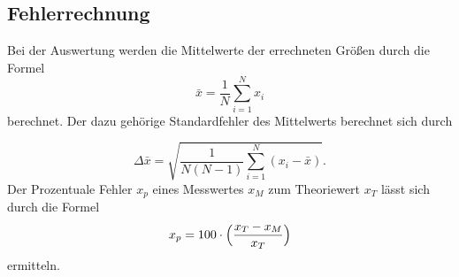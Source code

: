 \subsection{Fehlerrechnung}
Bei der Auswertung werden die Mittelwerte 
der errechneten Größen durch die Formel
\begin{equation}
    \bar{x}=\frac{1}{N}\sum_{i=1}^N x_i
    \label{eq:2}
\end{equation}
berechnet. Der dazu gehörige Standardfehler
des Mittelwerts berechnet sich durch

 \begin{equation}
     \Delta\bar{x}=\sqrt{\frac{1}{N(N-1)}\sum_{i=1}^N (x_i-\bar{x})}.
     \label{eq:5}
 \end{equation}
\noindent Der Prozentuale Fehler $x_p$ eines
Messwertes $x_M$ zum Theoriewert $x_T$ lässt sich durch
die Formel
\begin{equation}
    x_p=100 \cdot \Bigl(\frac{x_T-x_M}{x_T}\Bigr)
\end{equation}
\noindent ermitteln.
